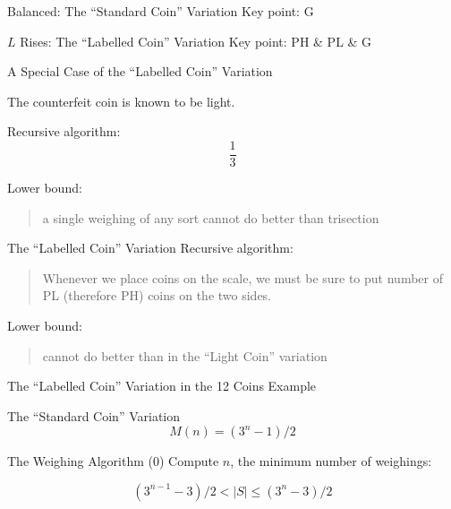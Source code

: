 \begin{frame}{Balanced: The ``Standard Coin'' Variation}
  Key point: G

\end{frame}

\begin{frame}{$L$ Rises: The ``Labelled Coin'' Variation}
  Key point: PH \& PL \& G

\end{frame}

\begin{frame}{A Special Case of the ``Labelled Coin'' Variation}
  \centerline{The counterfeit coin is known to be light.}

  Recursive algorithm: 
  \[
    \frac{1}{3}
  \]

  Lower bound: 
  \begin{quote}
    a single weighing of any sort cannot do better than trisection
  \end{quote}
\end{frame}

\begin{frame}{The ``Labelled Coin'' Variation}
  Recursive algorithm:
  \begin{quote}
    Whenever we place coins on the scale, 
    we must be sure to put  number of PL (therefore PH) coins on the two sides.
  \end{quote}

  Lower bound:
  \begin{quote}
    cannot do better than in the ``Light Coin'' variation
  \end{quote}
\end{frame}

\begin{frame}{The ``Labelled Coin'' Variation in the 12 Coins Example}
\end{frame}

\begin{frame}{The ``Standard Coin'' Variation}
  \[
    M(n) = (3^n - 1) / 2
  \]
\end{frame}

\begin{frame}{The Weighing Algorithm (0)}
  Compute $n$, the minimum number of weighings:

  \[
    (3^{n-1} - 3) / 2 < |S| \le (3^n - 3) / 2
  \]
\end{frame}


